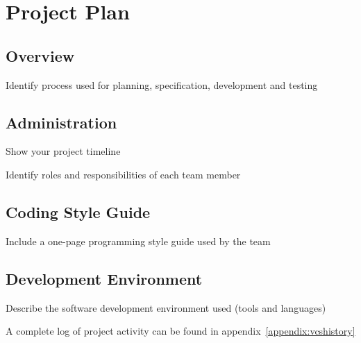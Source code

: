 \chapter{Project Plan}

\section{Overview}
Identify process used for planning, specification, development and testing

\section{Administration}
Show your project timeline

Identify roles and responsibilities of each team member

\section{Coding Style Guide}
Include a one-page programming style guide used by the team

\section{Development Environment}
Describe the software development environment used (tools and languages)

A complete log of project activity can be found in appendix~\ref{appendix:vcshistory}
